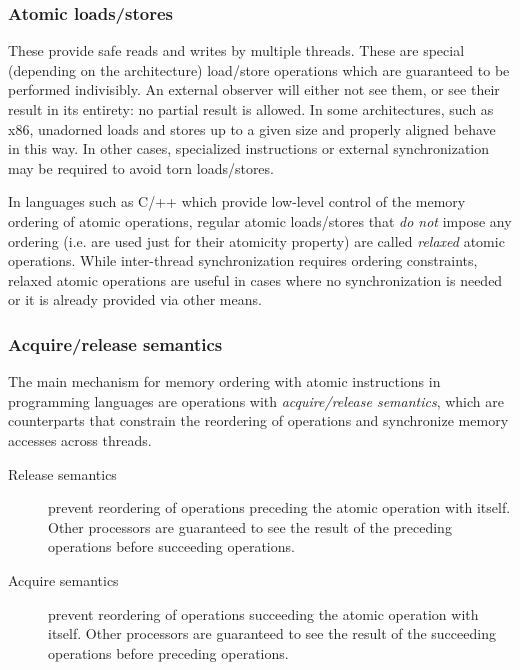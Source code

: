 
\subsubsection{Atomic loads/stores}

These provide safe reads and writes by multiple threads.  These are special
(depending on the architecture) load/store operations which are guaranteed to be
performed indivisibly.  An external observer will either not see them, or see
their result in its entirety: no partial result is allowed.  In some
architectures, such as x86, unadorned loads and stores up to a given size and
properly aligned behave in this way.  In other cases, specialized instructions
or external synchronization may be required to avoid torn loads/stores.

In languages such as C/++ which provide low-level control of the memory ordering
of atomic operations, regular atomic loads/stores that \emph{do not} impose any
ordering (i.e. are used just for their atomicity property) are called
\textit{relaxed} atomic operations.  While inter-thread synchronization requires
ordering constraints, relaxed atomic operations are useful in cases where no
synchronization is needed or it is already provided via other means.

\subsubsection{Acquire/release semantics}

The main mechanism for memory ordering with atomic instructions in programming
languages are operations with \textit{acquire/release semantics}, which are
counterparts that constrain the reordering of operations and synchronize memory
accesses across threads.

\begin{description}
    \item[Release semantics]
        prevent reordering of operations preceding the atomic operation with
        itself.  Other processors are guaranteed to see the result of the
        preceding operations before succeeding operations.
    \item[Acquire semantics]
        prevent reordering of operations succeeding the atomic operation with
        itself.  Other processors are guaranteed to see the result of the
        succeeding operations before preceding operations.
\end{description}

